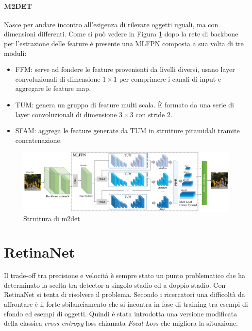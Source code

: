 \paragraph{M2DET} \cite{zhao2019m2det}
Nasce per andare incontro all'esigenza di rilevare oggetti uguali, ma con dimensioni differenti. Come si può vedere in Figura \ref{fig:m2det_architectures} dopo la rete di backbone per l'estrazione delle feature è presente una \ac{MLFPN} composta a sua volta di tre moduli:
\begin{itemize}
    \item \ac{FFM}: serve ad fondere le feature provenienti da livelli diversi, usano layer convoluzionali di dimensione $1 \times 1$ per comprimere i canali di input e aggregare le feature map. 
    \item \ac{TUM}: genera un gruppo di feature multi scala. È formato da una serie di layer convoluzionali di dimensione $3 \times 3$ con stride $2$. 
    \item \ac{SFAM}: aggrega le feature generate da \ac{TUM} in strutture piramidali tramite concatenazione.
\end{itemize}
\begin{figure}
    \centering
    \includegraphics[width=\textwidth]{images/pipeline_m2det.pdf}
    \caption{Struttura di m2det \cite{zhao2019m2det}}
    \label{fig:m2det_architectures}
\end{figure}

\section{RetinaNet}
\label{sec:retinanet}
Il trade-off tra precisione e velocità è sempre stato un punto problematico che ha determinato la scelta tra detector a singolo stadio ed a doppio stadio. Con RetinaNet \cite{lin2017focal} si tenta di risolvere il problema. Secondo i ricercatori una difficoltà da affrontare è il forte sbilanciamento che si incontra in fase di training tra esempi di sfondo ed esempi di oggetti. Quindi è stata introdotta una versione modificata della classica \textit{cross-entropy} loss chiamata \textit{Focal Loss} che migliora la situazione. 
